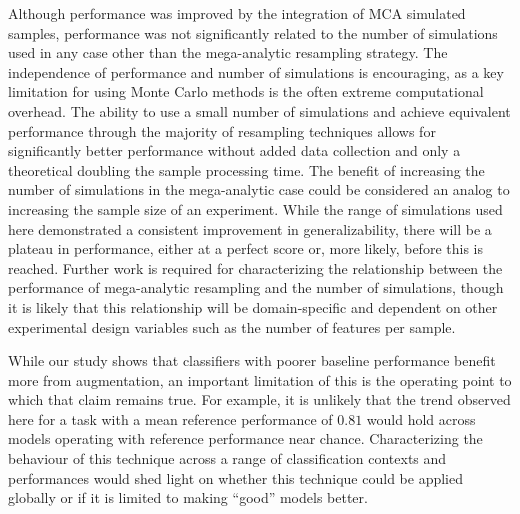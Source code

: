 \documentclass[10pt]{SelfArx} %
\begin{document}
Although performance was improved by the integration of MCA simulated samples, performance was not significantly
related to the number of simulations used in any case other than the mega-analytic resampling strategy. The
independence of performance and number of simulations is encouraging, as a key limitation for using Monte Carlo methods
is the often extreme computational overhead. The ability to use a small number of simulations and achieve equivalent
performance through the majority of resampling techniques allows for significantly better performance without added
data collection and only a theoretical doubling the sample processing time. The benefit of increasing the number of
simulations in the mega-analytic case could be considered an analog to increasing the sample size of an experiment.
While the range of simulations used here demonstrated a consistent improvement in generalizability, there will be a
plateau in performance, either at a perfect score or, more likely, before this is reached. Further work is required for
characterizing the relationship between the performance of mega-analytic resampling and the number of simulations,
though it is likely that this relationship will be domain-specific and dependent on other experimental design variables
such as the number of features per sample.

While our study shows that classifiers with poorer baseline performance benefit more from augmentation, an important
limitation of this is the operating point to which that claim remains true. For example, it is unlikely that the trend
observed here for a task with a mean reference performance of $0.81$ would hold across models operating with reference
performance near chance. Characterizing the behaviour of this technique across a range of classification contexts and
performances would shed light on whether this technique could be applied globally or if it is limited to making
``good'' models better.
\end{document}
